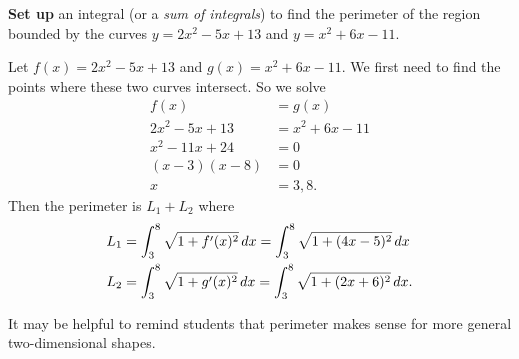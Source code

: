 \documentclass[noinstructornotes]{ximera}
\begin{document}
\begin{problem}
{\bf Set up} an integral (or a {\it sum of integrals}) to find the perimeter of the region bounded by the curves $y=2x^2-5x+13$ and $y=x^2+6x-11$.
	\begin{freeResponse}
	Let $f(x) = 2x^2-5x+13$ and $g(x) = x^2+6x-11$.
	We first need to find the points where these two curves intersect.  
	So we solve
		\begin{align*}
		f(x) &= g(x)  \\
		2x^2-5x+13 &= x^2+6x-11  \\
		x^2-11x+24 &= 0  \\
		(x-3)(x-8) &= 0  \\
		x &= 3,8.
		\end{align*}
	Then the perimeter is $L_1 + L_2$ where
		\begin{align*}
		L_1 &= \int_3^8 \sqrt{1+f'(x)^2} \,d x = \int_3^8 \sqrt{1+(4x-5)^2} \,d x  \\
		L_2 &= \int_3^8 \sqrt{1+g'(x)^2} \,d x = \int_3^8 \sqrt{1+(2x+6)^2} \,d x.
		\end{align*}	
	\end{freeResponse}
	
\end{problem}

\begin{instructorNotes}
It may be helpful to remind students that perimeter makes sense for more general two-dimensional shapes.
\end{instructorNotes}
\end{document}
